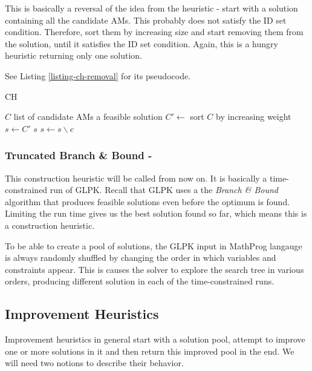 This is basically a reversal of the idea from the  heuristic - start with a solution containing all the candidate AMs. This probably does not satisfy the ID set condition. Therefore, sort them by increasing size and start removing them from the solution, until it satisfies the ID set condition. Again, this is a hungry heuristic returning only one solution.

See Listing \ref{listing-ch-removal} for its pseudocode.

\begin{algorithm}
\caption{ CH}
\label{listing-ch-removal}
\begin{algorithmic}
\REQUIRE $C$ list of candidate AMs
\ENSURE a feasible solution
\STATE $C' \gets $ sort $C$ by increasing weight
\STATE $s \gets C'$
    \RETURN $s$
  \ENDIF
  \STATE $s \gets s \backslash c$
\ENDFOR
\end{algorithmic}
\end{algorithm}

\subsubsection{Truncated Branch \& Bound - }

This construction heuristic will be called  from now on. It is basically a time-constrained run of GLPK. Recall that GLPK uses a the \textit{Branch \& Bound} algorithm that produces feasible solutions even before the optimum is found. Limiting the run time gives us the best solution found so far, which means this is a construction heuristic.

To be able to create a pool of solutions, the GLPK input in MathProg langauge is always randomly shuffled by changing the order in which variables and constraints appear. This is causes the solver to explore the search tree in various orders, producing different solution in each of the time-constrained runs.

\subsection{Improvement Heuristics}
\label{section-mip-ihs}


Improvement heuristics in general start with a solution pool, attempt to improve one or more solutions in it and then return this improved pool in the end. We will need two notions to describe their behavior.

